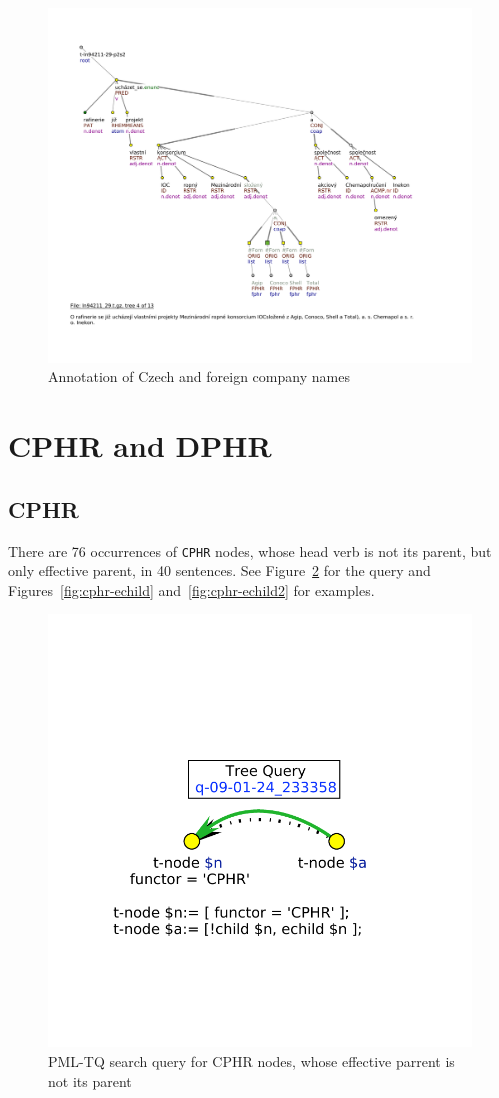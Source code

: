 \begin{figure}
\includegraphics[width=\textwidth]{images/vyhledavky/nazvy-firem.pdf}
\caption{Annotation of Czech and foreign company names}
\label{fig:forn-firmy}
\end{figure}

\section{CPHR and DPHR}

\subsection{CPHR}
There are 76 occurrences of {\tt CPHR} nodes, whose head verb is not its parent, but only effective parent, in 40 sentences. See Figure~\ref{fig:tq-echild} for the query and Figures~\ref{fig:cphr-echild} and~\ref{fig:cphr-echild2} for examples.
\begin{figure}
\includegraphics[width=0.3 \textwidth]{images/vyhledavky/query-echild.pdf}
\caption{PML-TQ search query for CPHR nodes, whose effective parrent is not its parent}
\label{fig:tq-echild}
\end{figure}

